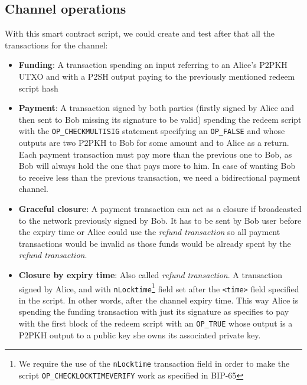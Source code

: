 \documentclass[12pt,journal,compsoc]{IEEEtran}
\newcommand{\code}[1]{\texttt{#1}}
\begin{document}
\subsection{Channel operations}
With this smart contract script, we could create and test after that all the transactions for the channel:
\begin{itemize}
    \item \textbf{Funding}: A transaction spending an input referring to an Alice's P2PKH UTXO and with a P2SH output paying to the previously mentioned redeem script hash
    \item \textbf{Payment}: A transaction signed by both parties (firstly signed by Alice and then sent to Bob missing its signature to be valid) spending the redeem script with the \code{OP\_CHECKMULTISIG} statement specifying an \code{OP\_FALSE} and whose outputs are two P2PKH to Bob for some amount and to Alice as a return. Each payment transaction must pay more than the previous one to Bob, as Bob will always hold the one that pays more to him. In case of wanting Bob to receive less than the previous transaction, we need a bidirectional payment channel.
    \item \textbf{Graceful closure}: A payment transaction can act as a closure if broadcasted to the network previously signed by Bob. It has to be sent by Bob user before the expiry time or Alice could use the \textit{refund transaction} so all payment transactions would be invalid as those funds would be already spent by the \textit{refund transaction}.
    \item \textbf{Closure by expiry time}: Also called \textit{refund transaction}. A transaction signed by Alice, and with \code{nLocktime}\footnote{We require the use of the \code{nLocktime} transaction field in order to make the script \code{OP\_CHECKLOCKTIMEVERIFY} work as specified in BIP-65\cite{bip-65:online}} field set after the \code{<time>} field specified in the script. In other words, after the channel expiry time. This way Alice is spending the funding transaction with just its signature as specifies to pay with the first block of the redeem script with an \code{OP\_TRUE} whose output is a P2PKH output to a public key she owns its associated private key.
\end{itemize}
\end{document}
